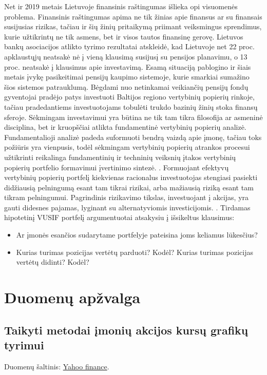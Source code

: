\documentclass[12pt]{article}
\begin{document}
Net ir 2019 metais Lietuvoje finansinis raštingumas išlieka opi visuomenės problema. Finansinis raštingumas apima ne tik žinias apie finansus ar su finansais susijusias rizikas, tačiau ir šių žinių pritaikymą priimant veiksmingus sprendimus, kurie užtikrintų ne tik asmens, bet ir visos tautos finansinę gerovę. Lietuvos bankų asociacijos atlikto tyrimo rezultatai atskleidė, kad Lietuvoje net 22 proc. apklaustųjų neatsakė nė į vieną klausimą susijusį su pensijos planavimu, o 13 proc. neatsakė į klausimus apie investavimą. Esamą situaciją pablogino ir šiais metais įvykę pasikeitimai pensijų kaupimo sistemoje, kurie smarkiai sumažino šios sistemos patrauklumą. Bėgdami nuo netinkamai veikiančių pensijų fondų gyventojai pradėjo patys investuoti Baltijos regiono vertybinių popierių rinkoje, tačiau pradedantiems investuotojams tobulėti trukdo bazinių žinių stoka finansų sferoje. Sėkmingam investavimui yra būtina ne tik tam tikra filosofija ar asmeninė disciplina, bet ir kruopščiai atlikta fundamentinė vertybinių popierių analizė. Fundamentalioji analizė padeda suformuoti bendrą vaizdą apie įmonę, tačiau toks požiūris yra vienpusis, todėl sėkmingam vertybinių popierių atrankos procesui užtikrinti reikalinga fundamentinių ir techninių veiksnių įtakos vertybinių popierių portfelio formavimui įvertinimo sintezė. \cite{cibulskiene2006fundamentiniku}. Formuojant efektyvų vertybinių popierių portfelį kiekvienas racionalus investuotojas stengiasi pasiekti didžiausią pelningumą esant tam tikrai rizikai, arba mažiausią riziką esant tam tikram pelningumui. Pagrindinis rizikavimo tikslas, investuojant į akcijas, yra gauti didesnes pajamas, lyginant su alternatyviomis investicijomis. \cite{lileikiene2010akcijku}. Tirdamas hipotetinį VUSIF portfelį argumentuotai atsakysiu į išsikeltus klausimus:

\begin{itemize}
\item Ar įmonės esančios sudarytame portfelyje pateisina joms keliamus lūkesčius?
\item Kurias turimas pozicijas vertėtų parduoti? Kodėl? Kurias turimas pozicijas vertėtų didinti? Kodėl?
\end{itemize}


\section{Duomenų apžvalga}

\subsection{Taikyti metodai įmonių akcijos kursų grafikų tyrimui}
Duomenų šaltinis: \href{https://finance.yahoo.com/}{Yahoo finance}.
\end{document}
